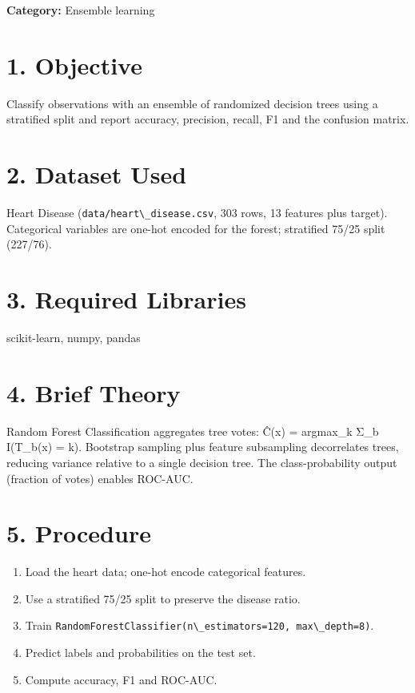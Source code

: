 \textbf{Category:} Ensemble learning

\section{1. Objective}\label{objective-1}

Classify observations with an ensemble of randomized decision trees
using a stratified split and report accuracy, precision, recall, F1 and
the confusion matrix.

\section{2. Dataset Used}\label{dataset-used-1}

Heart Disease (\passthrough{\lstinline!data/heart\_disease.csv!}, 303
rows, 13 features plus target). Categorical variables are one-hot
encoded for the forest; stratified 75/25 split (227/76).

\section{3. Required Libraries}\label{required-libraries-1}

scikit-learn, numpy, pandas

\section{4. Brief Theory}\label{brief-theory-1}

Random Forest Classification aggregates tree votes: Ĉ(x) = argmax\_k
Σ\_b I(T\_b(x) = k). Bootstrap sampling plus feature subsampling
decorrelates trees, reducing variance relative to a single decision
tree. The class-probability output (fraction of votes) enables ROC-AUC.

\section{5. Procedure}\label{procedure-1}

\begin{enumerate}
\def\labelenumi{\arabic{enumi}.}
\tightlist
\item
  Load the heart data; one-hot encode categorical features.
\item
  Use a stratified 75/25 split to preserve the disease ratio.
\item
  Train
  \passthrough{\lstinline!RandomForestClassifier(n\_estimators=120, max\_depth=8)!}.
\item
  Predict labels and probabilities on the test set.
\item
  Compute accuracy, F1 and ROC-AUC.
\end{enumerate}

